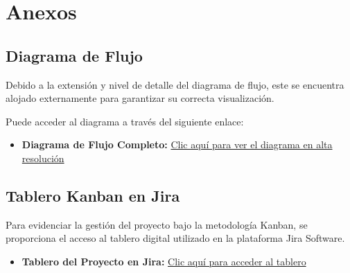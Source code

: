 \appendix
\chapter{Anexos}

\section{Diagrama de Flujo} \label{anexo:diagrama-flujo}

Debido a la extensión y nivel de detalle del diagrama de flujo, este se encuentra alojado externamente para garantizar su correcta visualización.

Puede acceder al diagrama a través del siguiente enlace:

\begin{itemize}
    \item \textbf{Diagrama de Flujo Completo:} \href{https://drive.google.com/file/d/1wPilhn4S6u7GL0W4__Oq78wbVK_OxKam/view?usp=drive_link}{Clic aquí para ver el diagrama en alta resolución}
\end{itemize}

\section{Tablero Kanban en Jira} \label{anexo:jira}

Para evidenciar la gestión del proyecto bajo la metodología Kanban, se proporciona el acceso al tablero digital utilizado en la plataforma Jira Software.

\begin{itemize}
    \item \textbf{Tablero del Proyecto en Jira:} \href{https://drive.google.com/drive/folders/1ooM-4BSJx5t8QPk4eBecuJhLRqjuC14Q?usp=sharing}{Clic aquí para acceder al tablero}
\end{itemize}

